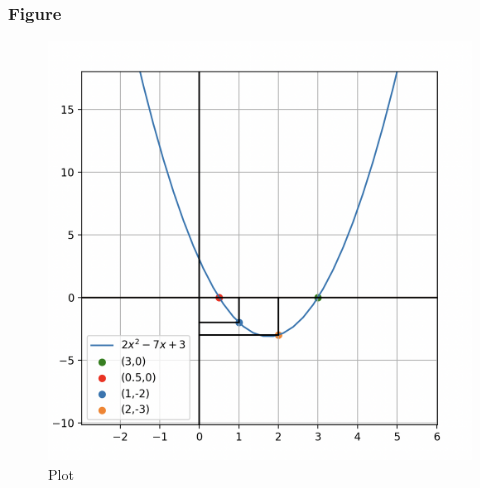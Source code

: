 \documentclass{beamer}
\begin{document}
\begin{frame}[fragile]
    \frametitle{Figure}
\begin{figure}[H]
    \centering
    \includegraphics[width=0.6\columnwidth]{Figs/9416.png}
    \caption{Plot}
    \label{fig:placeholder}
\end{figure}
\end{frame}
\end{document}
